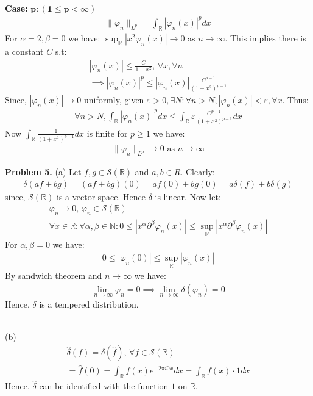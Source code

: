 \documentclass{article}
\newcommand{\R}{\mathbb{R}}
\newcommand{\N}{\mathbb{N}}
\newcommand{\Sc}{\mathcal{S}}
\begin{document}
\textbf{Case: } $\boldsymbol{p: (1 \leq p <\infty)}$
\begin{gather*}
    \lVert \varphi_n \rVert_{L^p} = \int_{\R} |\varphi_n(x)|^p dx
\end{gather*}
For $\alpha=2,\beta=0$ we have: $\sup_{\R} |x^2 \varphi_n(x)| \to 0$ as $n \to \infty$. This implies there is a constant $C$ s.t:
\begin{gather*}
    |\varphi_n(x)| \leq \frac{C}{1 + x^2}, \, \forall x, \forall n\\
    \implies |\varphi_n(x)|^p \leq |\varphi_n(x)| \frac{C^{p-1}}{(1 + x^2)^{p-1}}
\end{gather*}
Since, $|\varphi_n(x)| \to 0$ uniformly, given $\varepsilon>0, \exists N: \forall n>N, |\varphi_n(x)| < \varepsilon, \forall x$. Thus:
\begin{gather*}
    \forall n>N, \int_{\R} |\varphi_n(x)|^p dx \leq \int_{\R} \varepsilon \frac{C^{p-1}}{(1 + x^2)^{p-1}} dx
\end{gather*}
Now $\int_{\R} \frac{1}{(1 + x^2)^{p-1}} dx$ is finite for $p\geq 1$ we have:
\begin{gather*}
    \lVert \varphi_n \rVert_{L^p} \to 0 \text{ as } n\to \infty
\end{gather*}

\textbf{Problem 5. } (a) Let $f,g \in \Sc(\R)$ and $a,b \in R$. Clearly:
\begin{gather*}
    \delta(af+bg) = (af+bg)(0) = af(0) + bg(0) = a\delta(f) + b\delta(g)
\end{gather*}
since, $\Sc(\R)$ is a vector space. Hence $\delta$ is linear. Now let:
\begin{gather*}
    \varphi_n \to 0, \, \varphi_n \in \Sc(\R)\\
    \forall x \in \R: \forall \alpha,\beta \in \N: 0 \leq |x^{\alpha} \partial^{\beta} \varphi_n(x)| \leq \sup_{\R} |x^{\alpha} \partial^{\beta} \varphi_n(x)|
\end{gather*}
For $\alpha,\beta=0$ we have:
\begin{gather*}
    0 \leq |\varphi_n(0)| \leq \sup_{\R} |\varphi_n(x)|
\end{gather*}
By sandwich theorem and $n\to\infty$ we have:
\begin{gather*}
    \lim_{n\to\infty} \varphi_n = 0 \implies \lim_{n\to\infty} \delta(\varphi_n) = 0
\end{gather*}
Hence, $\delta$ is a tempered distribution.
\\~

(b)
\begin{gather*}
    \hat{\delta}(f) = \delta(\hat{f}), \, \forall f \in \Sc(\R)\\
    = \hat{f}(0) = \int_{\R} f(x) e^{-2\pi i 0 x} dx = \int_{\R} f(x) \cdot 1 dx
\end{gather*}
Hence, $\hat{\delta}$ can be identified with the function $1$ on $\R$.
\\~
\end{document}
